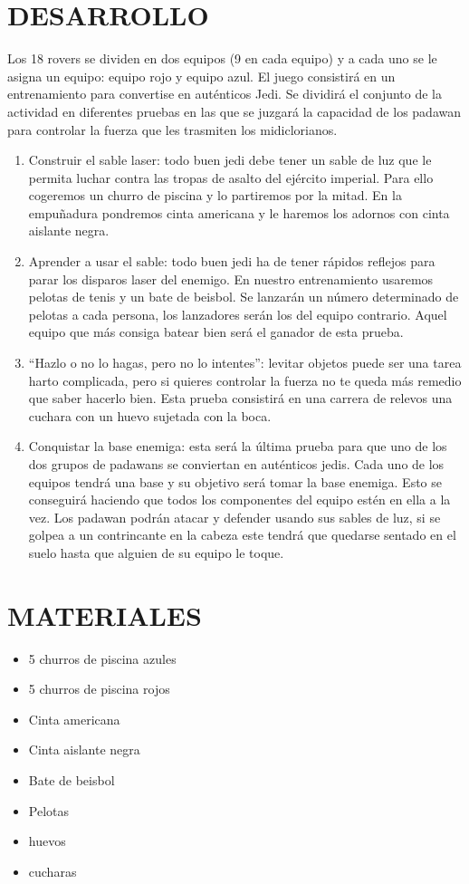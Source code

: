 \documentclass[72pt]{article}
\newlength{\w}
\begin{document}
\section*{DESARROLLO}
Los 18 rovers se dividen en dos equipos (9 en cada equipo) y a cada uno
se le asigna un equipo: equipo rojo y equipo azul.
El juego consistirá en un entrenamiento para convertise en auténticos
Jedi. Se dividirá el conjunto de la actividad en diferentes pruebas en las
que se juzgará la capacidad de los padawan para controlar la fuerza que
les trasmiten los midiclorianos.
\begin{enumerate}
    \item Construir el sable laser: todo buen jedi debe tener un sable de luz
        que le permita luchar contra las tropas de asalto del ejército
        imperial. Para ello cogeremos un churro de piscina y lo partiremos
        por la mitad. En la empuñadura pondremos cinta americana y le
        haremos los adornos con cinta aislante negra.
    \item Aprender a usar el sable: todo buen jedi ha de tener rápidos reflejos
        para parar los disparos laser del enemigo. En nuestro entrenamiento
        usaremos pelotas de tenis y un bate de beisbol. Se lanzarán un
        número determinado de pelotas a cada persona, los lanzadores
        serán los del equipo contrario. Aquel equipo que más consiga batear
        bien será el ganador de esta prueba.
    \item “Hazlo o no lo hagas, pero no lo intentes”: levitar objetos puede ser
        una tarea harto complicada, pero si quieres controlar la fuerza no te
        queda más remedio que saber hacerlo bien. Esta prueba consistirá
        en una carrera de relevos una cuchara con un huevo sujetada con la boca.
    \item Conquistar la base enemiga: esta será la última prueba para que
        uno de los dos grupos de padawans se conviertan en auténticos
        jedis. Cada uno de los equipos tendrá una base y su objetivo será
        tomar la base enemiga. Esto se conseguirá haciendo que todos los
        componentes del equipo estén en ella a la vez. Los padawan podrán
        atacar y defender usando sus sables de luz, si se golpea a un
        contrincante en la cabeza este tendrá que quedarse sentado en el
        suelo hasta que alguien de su equipo le toque.
\end{enumerate}

\section*{MATERIALES}
\begin{itemize}
    \item 5 churros de piscina azules
    \item 5 churros de piscina rojos
    \item Cinta americana
    \item Cinta aislante negra
    \item Bate de beisbol
    \item Pelotas
    \item huevos
    \item cucharas
\end{itemize} 
\end{document}
